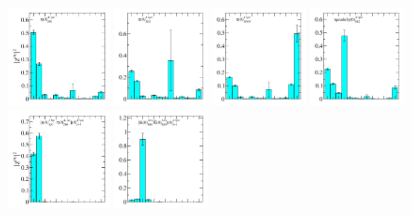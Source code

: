 \begin{figure}
  \includegraphics[width=0.24\textwidth]{figures/spectrum_a1gm/with_tq/zfactors/zfactor_pion-P000-A1gm_1-SS_0.pdf}
  \includegraphics[width=0.22\textwidth]{figures/spectrum_a1gm/with_tq/zfactors/zfactor_pion-P000-A1gm_1-SD_2.pdf}
  \includegraphics[width=0.22\textwidth]{figures/spectrum_a1gm/with_tq/zfactors/zfactor_pion-P000-A1gm_1-TDO_3.pdf}
  \includegraphics[width=0.22\textwidth]{figures/spectrum_a1gm/with_tq/zfactors/zfactor_tquudu3p-P000-A1gm_1-SS_2.pdf}\\
  \includegraphics[width=0.24\textwidth]{figures/spectrum_a1gm/with_tq/zfactors/zfactor_isotriplet_phi_pion-A1gm_1-P000-A1up-SS_0-P000-A1um-SS_0.pdf}
  \includegraphics[width=0.22\textwidth]{figures/spectrum_a1gm/with_tq/zfactors/zfactor_isotriplet_kaon_kbar-A1gm_1-P000-A1u-SS_0-P000-A1u-SS_0.pdf}

\end{figure}
